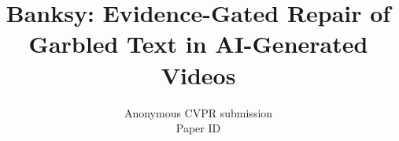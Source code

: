 \documentclass[10pt,twocolumn,letterpaper]{article}
\title{Banksy: Evidence-Gated Repair of Garbled Text in AI-Generated Videos}
\author{Anonymous CVPR submission\\
Paper ID \paperID}
\begin{document}
\maketitle









{
    \small
    
    
}

\end{document}
